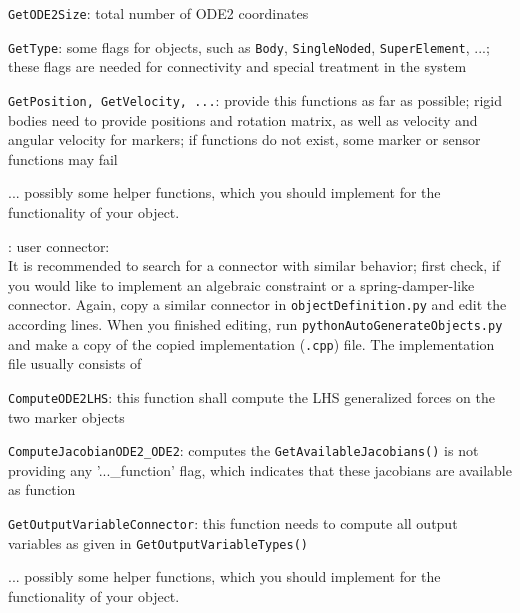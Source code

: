     \item \texttt{GetODE2Size}: total number of \ac{ODE2} coordinates
    \item \texttt{GetType}: some flags for objects, such as \texttt{Body}, \texttt{SingleNoded}, \texttt{SuperElement}, ...; these flags are needed for connectivity and special treatment in the system
    \item \texttt{GetPosition, GetVelocity, ...}: provide this functions as far as possible; rigid bodies need to provide positions and rotation matrix, as well as velocity and angular velocity for markers; if functions do not exist, some marker or sensor functions may fail
    \item ...   possibly some helper functions, which you should implement for the functionality of your object.
  \ei
  \item {}: user connector:\\
  It is recommended to search for a connector with similar behavior; first check, if you would like to implement 
  an algebraic constraint or a spring-damper-like connector.
  Again, copy a similar connector in \texttt{objectDefinition.py} and edit the according lines. 
  When you finished editing, run \texttt{pythonAutoGenerateObjects.py} and make a copy of the copied implementation (\texttt{.cpp}) file.
  The implementation file usually consists of
  \bi
    \item \texttt{ComputeODE2LHS}: this function shall compute the \ac{LHS} generalized forces on the two marker objects
    \item \texttt{ComputeJacobianODE2\_ODE2}: computes the \texttt{GetAvailableJacobians()} is not providing any '...\_function' flag, which indicates that these jacobians are available as function
    \item \texttt{GetOutputVariableConnector}: this function needs to compute all output variables as given in \texttt{GetOutputVariableTypes()}
    \item ...   possibly some helper functions, which you should implement for the functionality of your object.
  \ei
\ei




